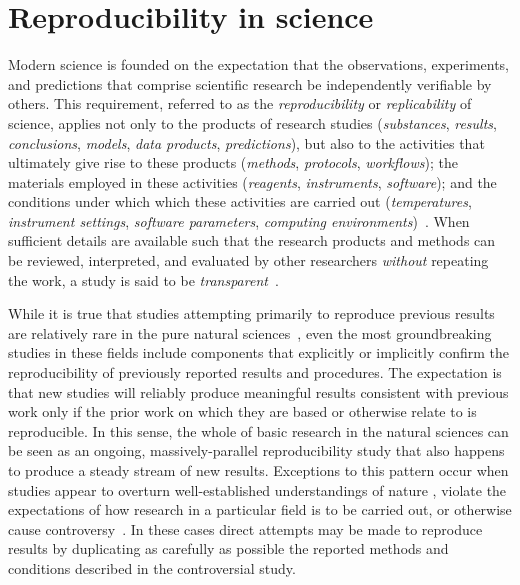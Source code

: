 \section{Reproducibility in science}\label{sec-reproducibility}

Modern science is founded on the expectation that the observations, experiments, and
	predictions that comprise scientific research be independently verifiable by others.
This requirement, referred to as the \emph{reproducibility} or \emph{replicability} of
	science, applies not only to the products of research studies (\emph{substances},
	\emph{results}, \emph{conclusions}, \emph{models}, \emph{data products},
	\emph{predictions}), but also to the activities that ultimately give rise to these
	products (\emph{methods}, \emph{protocols}, \emph{workflows}); the materials
	employed in these activities (\emph{reagents}, \emph{instruments},
	\emph{software}); and the conditions
	under which which these activities are carried out (\emph{temperatures},
	\emph{instrument settings}, \emph{software parameters},
	\emph{computing environments})~\cite{goodman2016what,committeeonreproducibilityandreplicabilityinscience2019reproducibility}.  When sufficient details are available
	such that the research products and methods can be reviewed, interpreted, and
	evaluated by other researchers \emph{without} repeating the work, a study is said to be
	\emph{transparent}~\cite{FASEB2016enhancing,committeeonreproducibilityandreplicabilityinscience2019reproducibility}.

While it is true that studies attempting primarily to reproduce previous results are relatively rare in the
	pure natural sciences~\cite{collins_changing_1985}, even the most groundbreaking studies in these fields include components
	that explicitly or implicitly confirm the reproducibility of previously reported results and procedures.
The expectation is that new studies will reliably produce meaningful results consistent with previous work
	only if the prior work on which they are based or otherwise relate to is reproducible.
In this sense, the whole of basic research in the natural sciences can be seen as an ongoing, massively-parallel
	reproducibility study that also happens to produce a steady stream of new results.
Exceptions to this pattern occur when studies appear to overturn
well-established understandings of nature \cite{kuhn1962structure},
	violate the expectations of how research in a particular field is to be carried out, or otherwise cause
    controversy~\cite{collins_changing_1985}.
In these cases direct attempts may be made to reproduce results by duplicating as carefully as possible
	the reported methods and conditions described in the controversial study.

